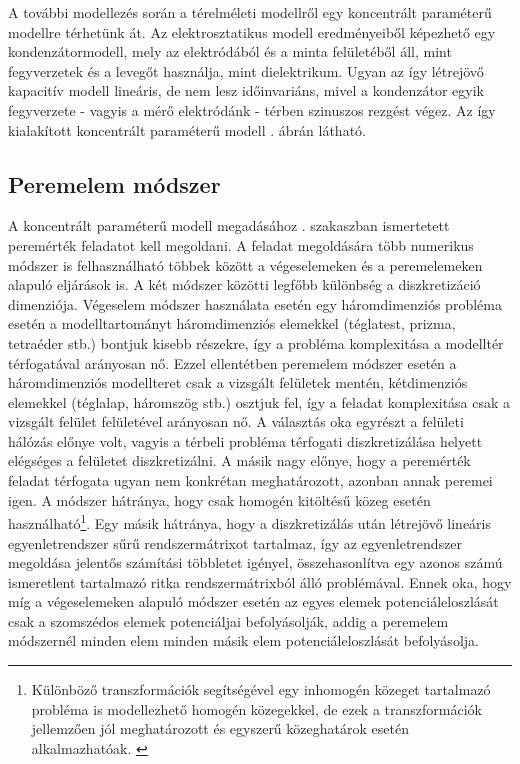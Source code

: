 A további modellezés során a térelméleti modellről egy koncentrált paraméterű modellre térhetünk át. Az elektrosztatikus modell eredményeiből képezhető egy kondenzátormodell, mely az elektródából és a minta felületéből áll, mint fegyverzetek és a levegőt használja, mint dielektrikum. Ugyan az így létrejövő kapacitív modell lineáris, de nem lesz időinvariáns, mivel a kondenzátor egyik fegyverzete - vagyis a mérő elektródánk - térben szinuszos rezgést végez. Az így kialakított koncentrált paraméterű modell . ábrán látható.


\subsection{Peremelem módszer}

A koncentrált paraméterű modell megadásához . szakaszban ismertetett peremérték feladatot kell megoldani. A feladat megoldására több numerikus módszer is felhasználható többek között a végeselemeken és a peremelemeken alapuló eljárások is. A két módszer közötti legfőbb különbség a diszkretizáció dimenziója. Végeselem módszer\cite{fem_nonwiki} használata esetén egy háromdimenziós probléma esetén a modelltartományt háromdimenziós elemekkel (téglatest, prizma, tetraéder stb.) bontjuk kisebb részekre, így a probléma komplexitása a modelltér térfogatával arányosan nő. Ezzel ellentétben peremelem módszer esetén a háromdimenziós modellteret csak a vizsgált felületek mentén, kétdimenziós elemekkel (téglalap, háromszög stb.) osztjuk fel, így a feladat komplexitása csak a vizsgált felület felületével arányosan nő. A választás oka egyrészt a felületi hálózás előnye volt, vagyis a térbeli probléma térfogati diszkretizálása helyett elégséges a felületet diszkretizálni. A másik nagy előnye, hogy a peremérték feladat térfogata ugyan nem konkrétan meghatározott, azonban annak peremei igen. A módszer hátránya, hogy csak homogén kitöltésű közeg esetén használható\footnote{Különböző transzformációk segítségével egy inhomogén közeget tartalmazó probléma is modellezhető homogén közegekkel, de ezek a transzformációk jellemzően jól meghatározott és egyszerű közeghatárok esetén alkalmazhatóak. \cite{bilicz}}. Egy másik hátránya, hogy a diszkretizálás után létrejövő lineáris egyenletrendszer sűrű rendszermátrixot tartalmaz, így az egyenletrendszer megoldása jelentős számítási többletet igényel, összehasonlítva egy azonos számú ismeretlent tartalmazó ritka rendszermátrixból álló problémával. Ennek oka, hogy míg a végeselemeken alapuló módszer esetén az egyes elemek potenciáleloszlását csak a szomszédos elemek potenciáljai befolyásolják, addig a peremelem módszernél minden elem minden másik elem potenciáleloszlását befolyásolja.

